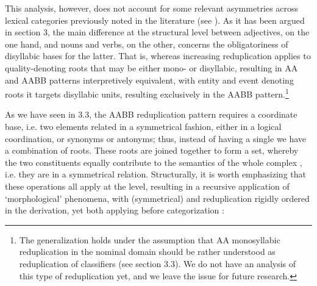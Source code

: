 \documentclass[output=paper]{langsci/langscibook}
\begin{document}
This analysis, however, does not account for some relevant asymmetries
across lexical categories previously noted in the literature (see %
\citealt{Zhang2015}%
%
). As it has been argued in section 3, the main difference at the
structural level between adjectives, on the one hand, and nouns and
verbs, on the other, concerns the obligatoriness of disyllabic bases for
the latter. That is, whereas increasing reduplication applies to
quality-denoting roots that may be either mono- or disyllabic, resulting
in AA and AABB patterns interpretively equivalent, with entity and event
denoting roots it targets disyllabic units, resulting exclusively in the
AABB pattern.\footnote{The generalization holds under the assumption that
  AA monosyllabic reduplication in the nominal domain should be rather
  understood as reduplication of classifiers (see section 3.3). We do
  not have an analysis of this type of reduplication yet, and we leave
  the issue for future research.}

As we have seen in 3.3, the AABB reduplication pattern requires a
coordinate base, i.e. two elements related in a symmetrical fashion,
either in a logical coordination, or synonyms or antonyms; thus, instead
of having a single  we have a combination of roots. These roots are
joined together to form a set, whereby the two constituents equally
contribute to the semantics of the whole complex , i.e. they are in
a symmetrical relation. Structurally, it is worth emphasizing that these
operations all apply at the  level, resulting in a recursive
application of `morphological' phenomena, with (symmetrical) 
and reduplication rigidly ordered in the derivation, yet both applying
before categorization %
\citep[see][]{Zhang2015}%
%
:

\ea\label{ex:BascianoMelloni:42}%
\z
\end{document}

